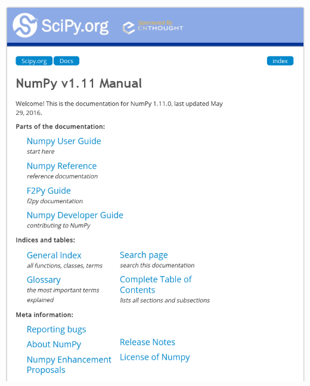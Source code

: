 \documentclass{beamer}
\begin{document}
\begin{frame}
\begin{columns}
\begin{column}[t]{0.5\textwidth}
\begin{center}
    \vspace{0.3truecm}
    \includegraphics[width=\textwidth]{NumpyManual}
   \end{center}
  \end{column}
 \end{columns}
\end{frame}
\end{document}
